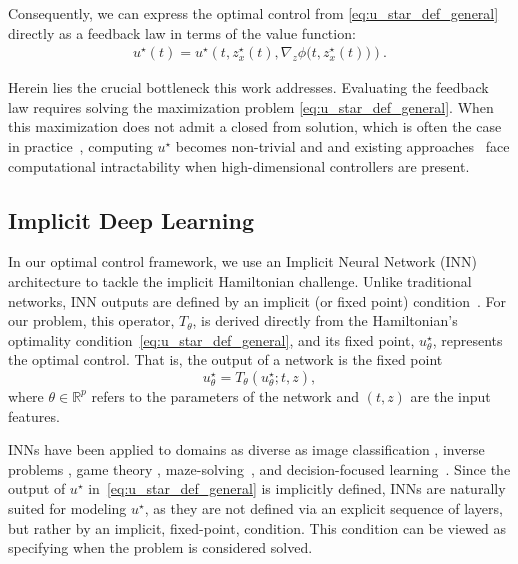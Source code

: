 \documentclass[letterpaper, 10 pt, conference]{ieeeconf}  %
\begin{document}
    Consequently, we can express the optimal control from \eqref{eq:u_star_def_general} directly as a feedback law in terms of the value function:
    \begin{equation}\label{eq:opt_control_nec}
    \begin{split}
      u^\star(t)=u^\star\left(t,z^\star_{x}(t),\nabla_{z} \phi \big(t,z_{x}^\star(t) \big) \right).
    \end{split}
    \end{equation}

    Herein lies the crucial bottleneck this work addresses. Evaluating the feedback law requires solving the maximization problem \eqref{eq:u_star_def_general}. When this maximization does not admit a closed from solution, which is often the case in practice~\cite{betts2010practical}, computing $u^\star$ becomes non-trivial and and existing approaches~\cite{onken2022neural, onken2021neural, meng2025recent,ruthotto2020machine, lin2021alternating} face computational intractability when high-dimensional controllers are present.
    
    \subsection{Implicit Deep Learning}
    \label{subsec: implicit_deep_learning}
    In our optimal control framework, we use an Implicit Neural Network (INN) architecture to tackle the implicit Hamiltonian challenge. Unlike traditional networks, INN outputs are defined by an implicit (or fixed point) condition~\cite{el2021implicit, fung2024generalization}. For our problem, this operator, $T_\theta$, is derived directly from the Hamiltonian's optimality condition~\eqref{eq:u_star_def_general}, and its fixed point, $u_\theta^\star$, represents the optimal control. That is, the output of a network is the fixed point 
    \begin{equation}
        u_\theta^\star = T_{\theta}(u_\theta^\star; t,z),
        \label{eq:fixed_point}
    \end{equation}
    where $\theta \in \mathbb{R}^p$ refers to the parameters of the network and $(t,z)$ are the input features.
    
     INNs have been applied to domains as diverse as image classification \cite{bai2020multiscale}, inverse problems \cite{gilton2021deep, Yin2022Learning, liu2022online, heaton2021feasibility}, game theory \cite{mckenzie2024three}, maze-solving~\cite{knutson2024logical}, and decision-focused learning~\cite{mckenzie2024differentiating}. 
    Since the output of $u^\star$ in~\eqref{eq:u_star_def_general} is implicitly defined, INNs are naturally suited for modeling $u^\star$, as they are not defined via an explicit sequence of layers, but rather by an implicit, fixed-point, condition. 
    This condition can be viewed as specifying when the problem is considered solved. 
    
\end{document}
